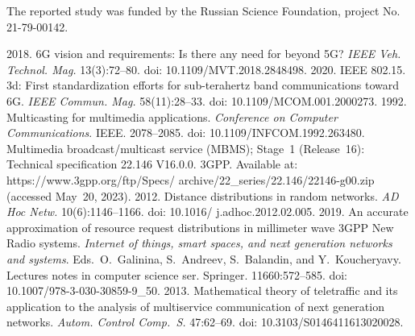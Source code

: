   
  
  

\vspace*{-14pt}

\Ack
  \noindent
  The reported study was funded by the Russian Science Foundation, project No.\,21-79-00142.

\vspace*{4pt}

  \begin{multicols}{2}

\renewcommand{\bibname}{\protect\rmfamily References}

{\small\frenchspacing
 {%
 \begin{thebibliography}{99}
   2018. 6G vision and requirements: Is there any need for 
beyond 5G? \textit{IEEE Veh. Technol. Mag.} 13(3):72--80. doi: 10.1109/MVT.2018.2848498.
   2020. IEEE 802.15. 3d: First standardization 
efforts for sub-terahertz band communications toward 6G. \textit{IEEE Commun. Mag.} 
58(11):28--33. doi: 10.1109/MCOM.001.2000273. 
   1992. Multicasting for multimedia 
applications. \textit{Conference on Computer Communications}. IEEE. 2078--2085. doi: 
10.1109/INFCOM.1992.263480. 
Multimedia broadcast/multicast service (MBMS); Stage~1 (Release~16): Technical specification 
22.146 V16.0.0. 3GPP. Available at:  {\sf 
https://www.3gpp.org/ftp/Specs/ archive/22\_series/22.146/22146-g00.zip} (accessed May~20, 2023).
 2012. Distance distributions in random networks. \textit{AD Hoc Netw.} 
10(6):1146--1166. doi: 10.1016/ j.adhoc.2012.02.005.
   2019. An accurate 
approximation of resource request distributions in millimeter wave 3GPP New Radio systems. 
\textit{Internet of things, smart spaces, and next generation networks and systems}. Eds.\ O.~Galinina, S.~Andreev, S.~Balandin,
and Y.~Koucheryavy. Lectures notes 
in computer science ser. Springer. 11660:572--585. doi: 10.1007/978-3-030-30859-9\_50.
   2013. Mathematical theory of 
teletraffic and its application to the analysis of multiservice communication of next generation 
networks. \textit{Autom. Control Comp.~S.}  47:62--69. doi:  10.3103/S0146411613020028.
  

\end{thebibliography}}}
\end{multicols}
